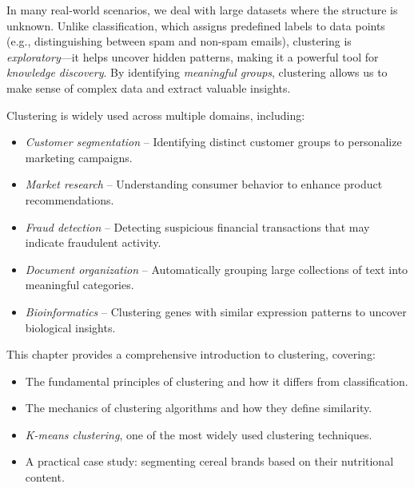 \documentclass[
  11pt,
]{book}
\providecommand{\tightlist}{%
  \setlength{\itemsep}{0pt}\setlength{\parskip}{0pt}}
\theoremstyle{definition}
\theoremstyle{definition}
\theoremstyle{definition}
\theoremstyle{definition}
\theoremstyle{remark}
\begin{document}
In many real-world scenarios, we deal with large datasets where the structure is unknown. Unlike classification, which assigns predefined labels to data points (e.g., distinguishing between spam and non-spam emails), clustering is \emph{exploratory}---it helps uncover hidden patterns, making it a powerful tool for \emph{knowledge discovery}. By identifying \emph{meaningful groups}, clustering allows us to make sense of complex data and extract valuable insights.

Clustering is widely used across multiple domains, including:

\begin{itemize}
\tightlist
\item
  \emph{Customer segmentation} -- Identifying distinct customer groups to personalize marketing campaigns.\\
\item
  \emph{Market research} -- Understanding consumer behavior to enhance product recommendations.\\
\item
  \emph{Fraud detection} -- Detecting suspicious financial transactions that may indicate fraudulent activity.\\
\item
  \emph{Document organization} -- Automatically grouping large collections of text into meaningful categories.\\
\item
  \emph{Bioinformatics} -- Clustering genes with similar expression patterns to uncover biological insights.
\end{itemize}

This chapter provides a comprehensive introduction to clustering, covering:

\begin{itemize}
\tightlist
\item
  The fundamental principles of clustering and how it differs from classification.\\
\item
  The mechanics of clustering algorithms and how they define similarity.\\
\item
  \emph{K-means clustering}, one of the most widely used clustering techniques.\\
\item
  A practical case study: segmenting cereal brands based on their nutritional content.
\end{itemize}
\end{document}
